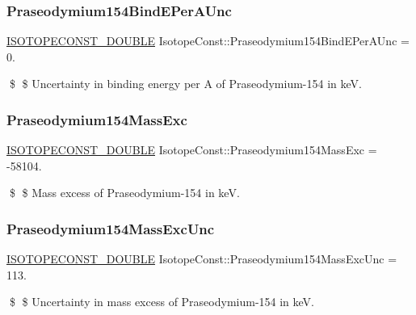 \subsubsection{\texorpdfstring{Praseodymium154\+Bind\+E\+Per\+A\+Unc}{Praseodymium154BindEPerAUnc}}
{\footnotesize\ttfamily \mbox{\hyperlink{group___isotope_const-_macros_ga8f45a7272ce02c0b4c65c44636ed719a}{I\+S\+O\+T\+O\+P\+E\+C\+O\+N\+S\+T\+\_\+\+D\+O\+U\+B\+LE}} Isotope\+Const\+::\+Praseodymium154\+Bind\+E\+Per\+A\+Unc = 0.}

\$ \$ Uncertainty in binding energy per A of Praseodymium-\/154 in keV. \mbox{\label{group___isotope_const-_praseodymium-_pr154_gaa44e9711bb2c24c195af0e736a680b82}} 
\subsubsection{\texorpdfstring{Praseodymium154\+Mass\+Exc}{Praseodymium154MassExc}}
{\footnotesize\ttfamily \mbox{\hyperlink{group___isotope_const-_macros_ga8f45a7272ce02c0b4c65c44636ed719a}{I\+S\+O\+T\+O\+P\+E\+C\+O\+N\+S\+T\+\_\+\+D\+O\+U\+B\+LE}} Isotope\+Const\+::\+Praseodymium154\+Mass\+Exc = -\/58104.}

\$ \$ Mass excess of Praseodymium-\/154 in keV. \mbox{\label{group___isotope_const-_praseodymium-_pr154_ga3620ab96132e3d91c7044b077f41fc1a}} 
\subsubsection{\texorpdfstring{Praseodymium154\+Mass\+Exc\+Unc}{Praseodymium154MassExcUnc}}
{\footnotesize\ttfamily \mbox{\hyperlink{group___isotope_const-_macros_ga8f45a7272ce02c0b4c65c44636ed719a}{I\+S\+O\+T\+O\+P\+E\+C\+O\+N\+S\+T\+\_\+\+D\+O\+U\+B\+LE}} Isotope\+Const\+::\+Praseodymium154\+Mass\+Exc\+Unc = 113.}

\$ \$ Uncertainty in mass excess of Praseodymium-\/154 in keV. \mbox{\label{group___isotope_const-_praseodymium-_pr154_ga52f6343c7062aa5fe2253e0ea41abe25}} 
